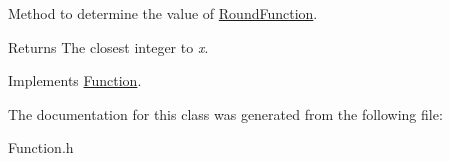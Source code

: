 Method to determine the value of \hyperlink{class_round_function}{Round\+Function}. 

\begin{DoxyReturn}{Returns}
The closest integer to {\itshape x}. 
\end{DoxyReturn}


Implements \hyperlink{class_function_a7773feae8f1def0a2d7e479363700816}{Function}.



The documentation for this class was generated from the following file\+:\begin{DoxyCompactItemize}
\item 
Function.\+h\end{DoxyCompactItemize}
